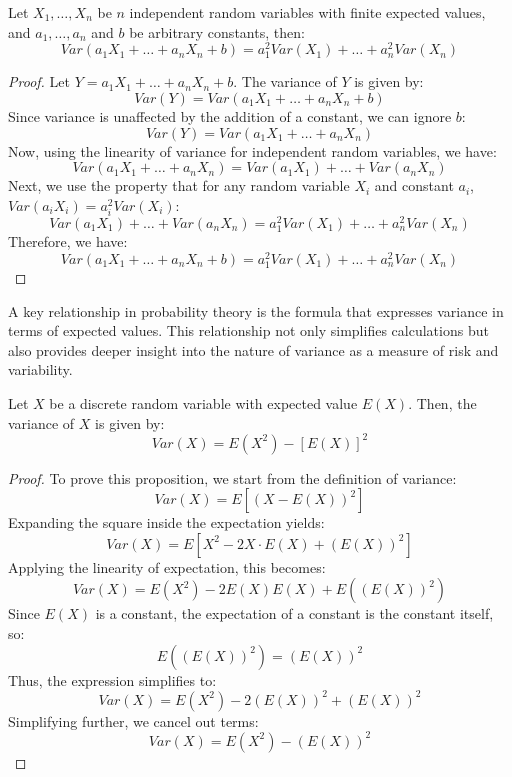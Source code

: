 \begin{proposition}
Let \(X_{1}, \ldots, X_{n}\) be $n$ independent random variables with finite expected values, and \(a_{1},\ldots,a_{n}\) and \(b\) be arbitrary constants, then:
\[
Var\left(a_{1}X_{1}+\ldots+a_{n}X_{n}+b\right)=a_{1}^{2}Var\left(X_{1}\right)+\ldots+a_{n}^{2}Var\left(X_{n}\right)
\]
\end{proposition}
\begin{proof}
Let \(Y = a_{1}X_{1} + \ldots + a_{n}X_{n} + b\). The variance of \(Y\) is given by:
\[
Var(Y) = Var(a_{1}X_{1} + \ldots + a_{n}X_{n} + b)
\]
Since variance is unaffected by the addition of a constant, we can ignore \(b\):
\[
Var(Y) = Var(a_{1}X_{1} + \ldots + a_{n}X_{n})
\]
Now, using the linearity of variance for independent random variables, we have:
\[
Var(a_{1}X_{1} + \ldots + a_{n}X_{n}) = Var(a_{1}X_{1}) + \ldots + Var(a_{n}X_{n})
\]
Next, we use the property that for any random variable \(X_i\) and constant \(a_i\), \(Var(a_i X_i) = a_i^2 Var(X_i)\):
\[
Var(a_{1}X_{1}) + \ldots + Var(a_{n}X_{n}) = a_{1}^2 Var(X_{1}) + \ldots + a_{n}^2 Var(X_{n})
\]
Therefore, we have:
\[
Var(a_{1}X_{1} + \ldots + a_{n}X_{n} + b) = a_{1}^{2}Var(X_{1}) + \ldots + a_{n}^{2}Var(X_{n})
\]
\end{proof}

A key relationship in probability theory is the formula that expresses variance in terms of expected values. This relationship not only simplifies calculations but also provides deeper insight into the nature of variance as a measure of risk and variability.

\begin{proposition}
Let $X$ be a discrete random variable with expected value $E(X)$. Then, the variance of $X$ is given by:
\[
Var(X) = E(X^2) - [E(X)]^2
\]
\end{proposition}
\begin{proof}
To prove this proposition, we start from the definition of variance:
\[
Var(X) = E[(X - E(X))^2]
\]
Expanding the square inside the expectation yields:
\[
Var(X) = E[X^2 - 2X \cdot E(X) + (E(X))^2]
\]
Applying the linearity of expectation, this becomes:
\[
Var(X) = E(X^2) - 2E(X)E(X) + E((E(X))^2)
\]
Since \(E(X)\) is a constant, the expectation of a constant is the constant itself, so:
\[
E((E(X))^2) = (E(X))^2
\]
Thus, the expression simplifies to:
\[
Var(X) = E(X^2) - 2(E(X))^2 + (E(X))^2
\]
Simplifying further, we cancel out terms:
\[
Var(X) = E(X^2) - (E(X))^2
\]
\end{proof}

